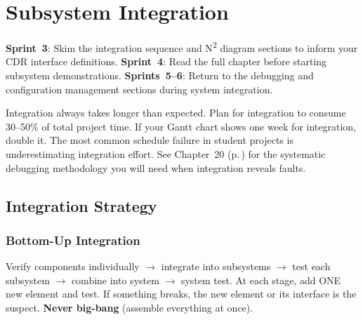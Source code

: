 \chapter{Subsystem Integration}\label{ch:integration}

\begin{tipbox}
\textbf{Sprint~3}: Skim the integration sequence and N\textsuperscript{2} diagram sections to inform your CDR interface definitions. \textbf{Sprint~4}: Read the full chapter before starting subsystem demonstrations. \textbf{Sprints~5--6}: Return to the debugging and configuration management sections during system integration.
\end{tipbox}

\begin{warningbox}
Integration always takes longer than expected. Plan for integration to consume 30--50\% of total project time. If your Gantt chart shows one week for integration, double it. The most common schedule failure in student projects is underestimating integration effort. See Chapter~20 (p.\,\pageref{ch:debug}) for the systematic debugging methodology you will need when integration reveals faults.
\end{warningbox}

\vspace{1em}
\vspace{1em}









\section{Integration Strategy}
\subsection{Bottom-Up Integration}
Verify components individually $\to$ integrate into subsystems $\to$ test each subsystem $\to$ combine into system $\to$ system test. At each stage, add ONE new element and test. If something breaks, the new element or its interface is the suspect. \textbf{Never big-bang} (assemble everything at once).

